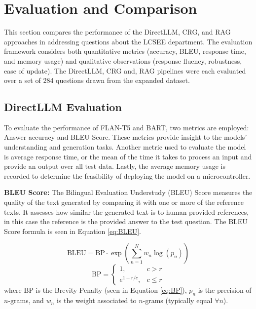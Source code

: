 \documentclass[conference]{IEEEtran}
\begin{document}
\section{Evaluation and Comparison} \label{sec:evaluation}
This section compares the performance of the DirectLLM, CRG, and RAG approaches in addressing questions about the LCSEE department.
The evaluation framework considers both quantitative metrics (accuracy, BLEU, response time, and memory usage) and qualitative observations (response fluency, robustness, ease of update).
The DirectLLM, CRG and, RAG pipelines were each evaluated over a set of 284 questions drawn from the expanded dataset.
\subsection{DirectLLM Evaluation}
To evaluate the performance of FLAN-T5 and BART, two metrics are employed: Answer accuracy and BLEU Score. 
These metrics provide insight to the models' understanding and generation tasks.
Another metric used to evaluate the model is average response time, or the mean of the time it takes to process an input and provide an output over all test data.
Lastly, the average memory usage is recorded to determine the feasibility of deploying the model on a microcontroller.

\noindent


\noindent
\textbf{BLEU Score:}
The Bilingual Evaluation Understudy (BLEU) Score measures the quality of the text generated by comparing it with one or more of the reference texts.
It assesses how similar the generated text is to human-provided references, in this case the reference is the provided answer to the test question. 
The BLEU Score formula is seen in Equation \ref{eq:BLEU}.

\begin{equation} \label{eq:BLEU}
    \text{BLEU} = \text{BP} \cdot \exp \left( \sum_{n=1}^{N} w_n \log(p_n) \right)
\end{equation}
\begin{equation} \label{eq:BP}
    \text{BP} = 
    \begin{cases}
        1, & c > r \\
        e^{1 - r/c}, & c \leq r
    \end{cases}
\end{equation}
\noindent
where $\text{BP}$ is the Brevity Penalty (seen in Equation \ref{eq:BP}), $p_n$ is the precision of $n$-grams, and $w_n$ is the weight associated to $n$-grams (typically equal $\forall n$).
\end{document}
